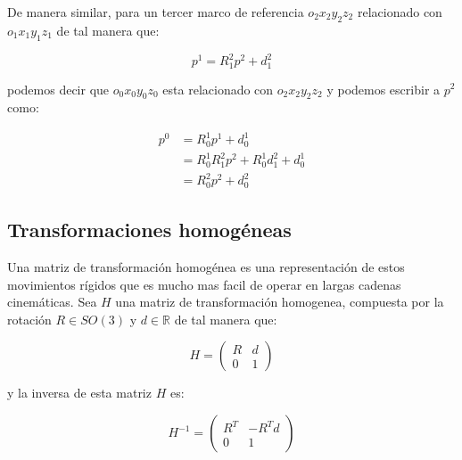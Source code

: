 \begin{multicols*}{2}
            De manera similar, para un tercer marco de referencia $o_2 x_2 y_2 z_2$ relacionado con $o_1 x_1 y_1 z_1$ de tal manera que:

            \begin{equation*}
                p^1 = R_1^2 p^2 + d_1^2
            \end{equation*}

            podemos decir que $o_0 x_0 y_0 z_0$ esta relacionado con $o_2 x_2 y_2 z_2$ y podemos escribir a $p^2$ como:

            \begin{align*}
                p^0 &= R_0^1 p^1 + d_0^1 \\
                &= R_0^1 R_1^2 p^2 + R_0^1 d_1^2 + d_0^1 \\
                &= R_0^2 p^2 + d_0^2
            \end{align*}


        \subsection{Transformaciones homogéneas}

            Una matriz de transformación homogénea es una representación de estos movimientos rígidos que es mucho mas facil de operar en largas cadenas cinemáticas. Sea $H$ una matriz de transformación homogenea, compuesta por la rotación $R \in SO(3)$ y $d \in \mathbb{R}$ de tal manera que:

            \begin{equation}
                H =
                \begin{pmatrix}
                    R & d \\
                    0 & 1
                \end{pmatrix}
            \end{equation}

            y la inversa de esta matriz $H$ es:

            \begin{equation}
                H^{-1} =
                \begin{pmatrix}
                    R^T & -R^T d \\
                    0 & 1
                \end{pmatrix}
            \end{equation}


\end{multicols*}
